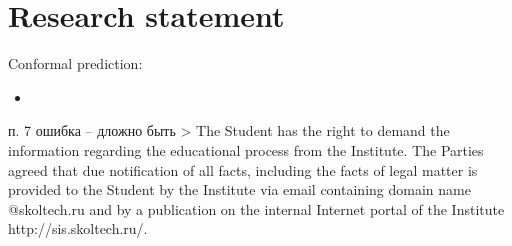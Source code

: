 \section{Research statement} %
\label{sec:research_statement}

Conformal prediction:\begin{itemize}
	\item 
\end{itemize}


п. 7 ошибка -- дложно быть
> The Student has the right to demand the information regarding the educational process from the Institute. The Parties agreed that due notification of all facts, including the facts of legal matter is provided to the Student by the Institute via email containing domain name @skoltech.ru and by a publication on the internal Internet portal of the Institute http://sis.skoltech.ru/.



